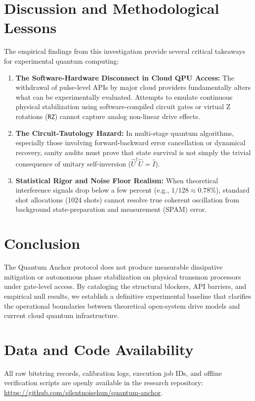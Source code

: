 \documentclass[11pt,a4paper]{article}
\begin{document}
\section{Discussion and Methodological Lessons}

The empirical findings from this investigation provide several critical takeaways for experimental quantum computing:

\begin{enumerate}
  \item \textbf{The Software-Hardware Disconnect in Cloud QPU Access:} The withdrawal of pulse-level APIs by major cloud providers fundamentally alters what can be experimentally evaluated. Attempts to emulate continuous physical stabilization using software-compiled circuit gates or virtual Z rotations (\texttt{RZ}) cannot capture analog non-linear drive effects.
  \item \textbf{The Circuit-Tautology Hazard:} In multi-stage quantum algorithms, especially those involving forward-backward error cancellation or dynamical recovery, sanity audits must prove that state survival is not simply the trivial consequence of unitary self-inversion ($\hat{U}^{\dagger}\hat{U} = \hat{I}$).
  \item \textbf{Statistical Rigor and Noise Floor Realism:} When theoretical interference signals drop below a few percent (e.g., $1/128 \approx 0.78\%$), standard shot allocations (1024 shots) cannot resolve true coherent oscillation from background state-preparation and measurement (SPAM) error.
\end{enumerate}

\section{Conclusion}

The Quantum Anchor protocol does not produce measurable dissipative mitigation or autonomous phase stabilization on physical transmon processors under gate-level access. By cataloging the structural blockers, API barriers, and empirical null results, we establish a definitive experimental baseline that clarifies the operational boundaries between theoretical open-system drive models and current cloud quantum infrastructure.

\section*{Data and Code Availability}
All raw bitstring records, calibration logs, execution job IDs, and offline verification scripts are openly available in the research repository: \url{https://github.com/silentnoisehun/quantum-anchor}.
\end{document}
